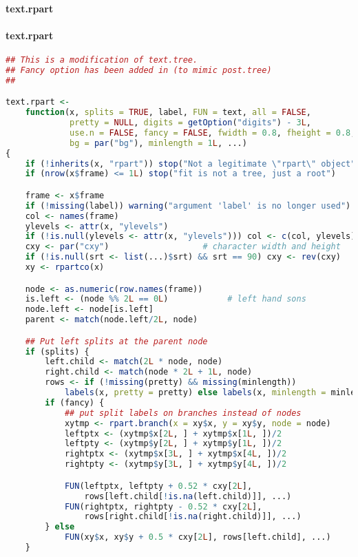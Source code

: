 \documentclass[10pt,a4paper]{article}
\begin{document}
\paragraph*{text.rpart}
\paragraph{text.rpart}
\begin{lstlisting}[language=R]
## This is a modification of text.tree.
## Fancy option has been added in (to mimic post.tree)
##

text.rpart <-
    function(x, splits = TRUE, label, FUN = text, all = FALSE,
             pretty = NULL, digits = getOption("digits") - 3L,
             use.n = FALSE, fancy = FALSE, fwidth = 0.8, fheight = 0.8,
             bg = par("bg"), minlength = 1L, ...)
{
    if (!inherits(x, "rpart")) stop("Not a legitimate \"rpart\" object")
    if (nrow(x$frame) <= 1L) stop("fit is not a tree, just a root")

    frame <- x$frame
    if (!missing(label)) warning("argument 'label' is no longer used")
    col <- names(frame)
    ylevels <- attr(x, "ylevels")
    if (!is.null(ylevels <- attr(x, "ylevels"))) col <- c(col, ylevels)
    cxy <- par("cxy")                   # character width and height
    if (!is.null(srt <- list(...)$srt) && srt == 90) cxy <- rev(cxy)
    xy <- rpartco(x)

    node <- as.numeric(row.names(frame))
    is.left <- (node %% 2L == 0L)            # left hand sons
    node.left <- node[is.left]
    parent <- match(node.left/2L, node)

    ## Put left splits at the parent node
    if (splits) {
        left.child <- match(2L * node, node)
        right.child <- match(node * 2L + 1L, node)
        rows <- if (!missing(pretty) && missing(minlength))
            labels(x, pretty = pretty) else labels(x, minlength = minlength)
        if (fancy) {
            ## put split labels on branches instead of nodes
            xytmp <- rpart.branch(x = xy$x, y = xy$y, node = node)
            leftptx <- (xytmp$x[2L, ] + xytmp$x[1L, ])/2
            leftpty <- (xytmp$y[2L, ] + xytmp$y[1L, ])/2
            rightptx <- (xytmp$x[3L, ] + xytmp$x[4L, ])/2
            rightpty <- (xytmp$y[3L, ] + xytmp$y[4L, ])/2

            FUN(leftptx, leftpty + 0.52 * cxy[2L],
                rows[left.child[!is.na(left.child)]], ...)
            FUN(rightptx, rightpty - 0.52 * cxy[2L],
                rows[right.child[!is.na(right.child)]], ...)
        } else
            FUN(xy$x, xy$y + 0.5 * cxy[2L], rows[left.child], ...)
    }


\end{lstlisting}
\end{document}
